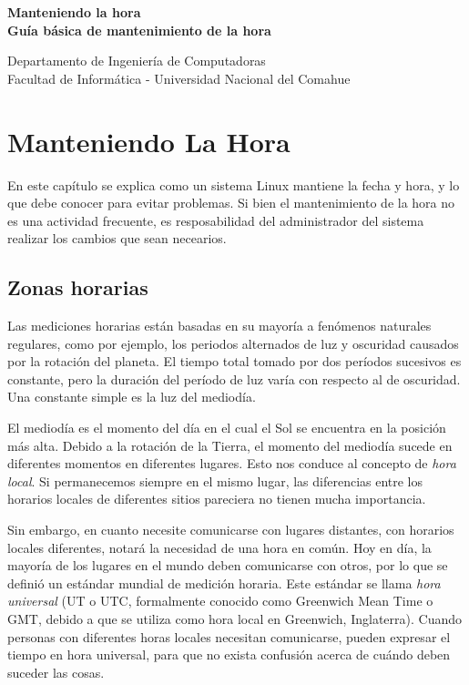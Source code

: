 \documentclass[12pt]{article}
\def\maketitle{

 \makeatletter
 {\color{bl} \centering \huge \sc \textbf{
 Manteniendo la hora \\ 
\large \vspace*{-8pt} \color{black} Guía básica de mantenimiento de la hora
 \vspace*{8pt} }\par}
 \makeatother


 \makeatletter
 {\centering \small 
 	Departamento de Ingeniería de Computadoras \\
 	Facultad de Informática - Universidad Nacional del Comahue \\
 	\vspace{20pt} }
 \makeatother

}
\begin{document}
\thispagestyle{empty}
\maketitle
\setlength{\parindent}{0pt}

\section{ Manteniendo La Hora}

En este capítulo se explica como un sistema Linux mantiene la fecha y hora,
y lo que debe conocer para evitar problemas. Si bien el mantenimiento de
la hora no es una actividad frecuente, es resposabilidad del administrador 
del sistema realizar los cambios que sean necearios. 


\subsection{ Zonas horarias}

Las mediciones horarias están basadas en su mayoría a fenómenos naturales regulares,
como por ejemplo, los periodos alternados de luz y oscuridad
causados por la rotación del planeta. El tiempo total tomado por dos períodos
sucesivos es constante, pero la duración del período de luz varía
con respecto al de oscuridad. Una constante simple es la luz del mediodía.

El mediodía es el momento del día en el cual el Sol se encuentra en la posición más alta. 
Debido a la rotación de la Tierra, el momento del mediodía sucede en diferentes 
momentos en diferentes lugares. Esto nos conduce al concepto de \textit{hora local}.
Si permanecemos siempre en el mismo lugar, las diferencias entre los
horarios locales de diferentes sitios pareciera no tienen mucha importancia.


Sin embargo, en cuanto necesite comunicarse con lugares distantes, con horarios locales 
diferentes, notará la necesidad de una hora en común. Hoy en día, la mayoría de los lugares en el mundo deben
comunicarse con otros, por lo que se definió un estándar mundial de medición
horaria. Este estándar se llama \textit{hora universal} (UT o UTC, formalmente
conocido como Greenwich Mean Time o GMT, debido a que se utiliza como hora
local en Greenwich, Inglaterra). Cuando personas con diferentes horas locales
necesitan comunicarse, pueden expresar el tiempo en hora universal,
para que no exista confusión acerca de cuándo deben suceder las cosas.
\end{document}
